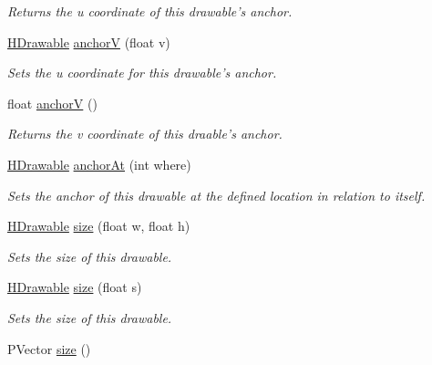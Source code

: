 \begin{DoxyCompactItemize}
\begin{DoxyCompactList}\small\item\em Returns the {\ttfamily u} coordinate of this drawable's anchor. \end{DoxyCompactList}\item 
\hyperlink{classhype_1_1core_1_1drawable_1_1_h_drawable}{H\-Drawable} \hyperlink{classhype_1_1core_1_1drawable_1_1_h_drawable_a8044b153765d032c5441a7842ada1afc}{anchor\-V} (float v)
\begin{DoxyCompactList}\small\item\em Sets the {\ttfamily u} coordinate for this drawable's anchor. \end{DoxyCompactList}\item 
float \hyperlink{classhype_1_1core_1_1drawable_1_1_h_drawable_a55098c318cbf8952341267c84451e513}{anchor\-V} ()
\begin{DoxyCompactList}\small\item\em Returns the {\ttfamily v} coordinate of this draable's anchor. \end{DoxyCompactList}\item 
\hyperlink{classhype_1_1core_1_1drawable_1_1_h_drawable}{H\-Drawable} \hyperlink{classhype_1_1core_1_1drawable_1_1_h_drawable_ab75ab965c009e70676767ba88016053c}{anchor\-At} (int where)
\begin{DoxyCompactList}\small\item\em Sets the anchor of this drawable at the defined location in relation to itself. \end{DoxyCompactList}\item 
\hyperlink{classhype_1_1core_1_1drawable_1_1_h_drawable}{H\-Drawable} \hyperlink{classhype_1_1core_1_1drawable_1_1_h_drawable_ae046413f91234f66dde997ef02908e24}{size} (float w, float h)
\begin{DoxyCompactList}\small\item\em Sets the size of this drawable. \end{DoxyCompactList}\item 
\hyperlink{classhype_1_1core_1_1drawable_1_1_h_drawable}{H\-Drawable} \hyperlink{classhype_1_1core_1_1drawable_1_1_h_drawable_a2c8b70fd46b03299178eb14ca57baaa4}{size} (float s)
\begin{DoxyCompactList}\small\item\em Sets the size of this drawable. \end{DoxyCompactList}\item 
P\-Vector \hyperlink{classhype_1_1core_1_1drawable_1_1_h_drawable_a91deb3e8a0b504c602670764733a744f}{size} ()

\end{DoxyCompactItemize}
